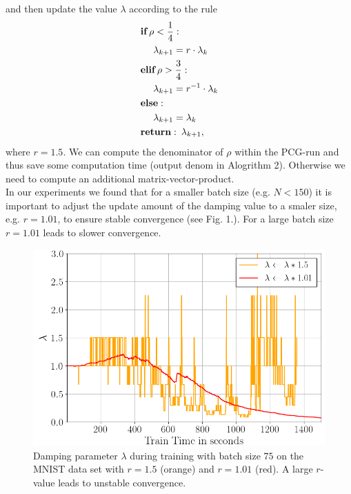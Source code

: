 \documentclass[conference]{IEEEtran}
\begin{document}
	and then update the value $\lambda$ according to the rule
	\begin{align}
	&\textbf{if}\:\rho<\frac{1}{4}:\notag\\
	&\text{ }\text{ }\text{ }\text{ }\lambda_{k+1} = r\cdot\lambda_{k}\notag\\
	&\textbf{elif}\:\rho>\frac{3}{4}:\notag\\
	&\text{ }\text{ }\text{ }\text{ }\lambda_{k + 1} = r^{-1}\cdot\lambda_{k}\notag\\
	&\textbf{else}: \notag\\
	&\text{ }\text{ }\text{ }\text{ }\lambda_{k + 1} = \lambda_{k}\notag\\
	&\textbf{return}:\:\lambda_{k + 1},
	\end{align}
	where $r=1.5$. We can compute the denominator of $\rho$ within the PCG-run and thus save some computation time (output denom in Alogrithm 2). Otherwise we need to compute an additional matrix-vector-product.\\
	In our experiments we found that for a smaller batch size (e.g. $N<150$) it is important to adjust the update amount of the damping value to a smaler size, e.g. $r=1.01$, to ensure stable convergence (see Fig. 1.). For a large batch size $r=1.01$ leads to slower convergence.
	
	\begin{figure}[htbp]
		\centerline{\includegraphics[scale=0.52]{lambda.png}}
		\caption{Damping parameter $\lambda$ during training with batch size $75$ on the MNIST data set with $r=1.5$ (orange) and $r=1.01$ (red). A large $r$-value leads to unstable convergence.}
		\label{fig}
	\end{figure}
	
\end{document}
